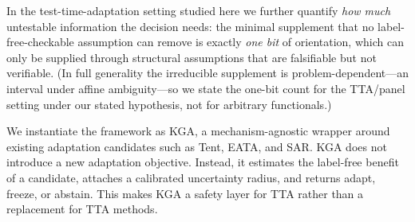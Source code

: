 \documentclass[conference]{IEEEtran}
\theoremstyle{plain}
\theoremstyle{definition}
\begin{document}
In the test-time-adaptation setting studied here we further quantify \emph{how much} untestable
information the decision needs: the minimal supplement that no label-free-checkable assumption can
remove is exactly \emph{one bit} of orientation, which can only be supplied through structural
assumptions that are falsifiable but not verifiable. (In full generality the irreducible supplement
is problem-dependent---an interval under affine ambiguity---so we state the one-bit count for the
TTA/panel setting under our stated hypothesis, not for arbitrary functionals.)

We instantiate the framework as \textsc{KGA}, a mechanism-agnostic wrapper around
existing adaptation candidates such as Tent, EATA, and SAR. \textsc{KGA} does not
introduce a new adaptation objective. Instead, it estimates the label-free benefit
of a candidate, attaches a calibrated uncertainty radius, and returns adapt,
freeze, or abstain. This makes \textsc{KGA} a safety layer for TTA rather than a
replacement for TTA methods.
\end{document}
